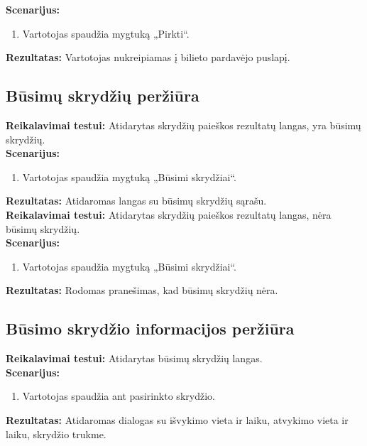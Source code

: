 \documentclass{VUMIFPSkursinis}
\begin{document}
            \noindent\textbf{Scenarijus:}
                \begin{enumerate}
                    \item Vartotojas spaudžia mygtuką „Pirkti“.
                \end{enumerate}
            \textbf{Rezultatas:} Vartotojas nukreipiamas į bilieto pardavėjo puslapį.\\

        \subsection{Būsimų skrydžių peržiūra}
            \noindent\textbf{Reikalavimai testui:} Atidarytas skrydžių paieškos rezultatų langas, yra būsimų skrydžių.\\

            \noindent\textbf{Scenarijus:}
                \begin{enumerate}
                    \item Vartotojas spaudžia mygtuką „Būsimi skrydžiai“.
                \end{enumerate}
            \textbf{Rezultatas:} Atidaromas langas su būsimų skrydžių sąrašu.\\

            \noindent\textbf{Reikalavimai testui:} Atidarytas skrydžių paieškos rezultatų langas, nėra būsimų skrydžių.\\

            \noindent\textbf{Scenarijus:}
                \begin{enumerate}
                    \item Vartotojas spaudžia mygtuką „Būsimi skrydžiai“.
                \end{enumerate}
            \textbf{Rezultatas:} Rodomas pranešimas, kad būsimų skrydžių nėra.\\

        \subsection{Būsimo skrydžio informacijos peržiūra}
            \noindent\textbf{Reikalavimai testui:} Atidarytas būsimų skrydžių langas.\\

            \noindent\textbf{Scenarijus:}
                \begin{enumerate}
                    \item Vartotojas spaudžia ant pasirinkto skrydžio.
                \end{enumerate}
            \textbf{Rezultatas:} Atidaromas dialogas su išvykimo vieta ir laiku, atvykimo vieta ir laiku, skrydžio trukme.\\
\end{document}
